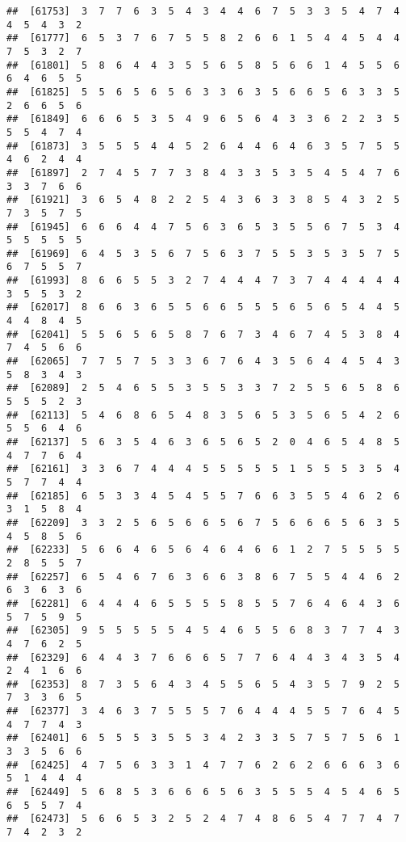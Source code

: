 \documentclass[
]{book}
\begin{document}
\begin{verbatim}
##  [61753]  3  7  7  6  3  5  4  3  4  4  6  7  5  3  3  5  4  7  4  4  5  4  3  2
##  [61777]  6  5  3  7  6  7  5  5  8  2  6  6  1  5  4  4  5  4  4  7  5  3  2  7
##  [61801]  5  8  6  4  4  3  5  5  6  5  8  5  6  6  1  4  5  5  6  6  4  6  5  5
##  [61825]  5  5  6  5  6  5  6  3  3  6  3  5  6  6  5  6  3  3  5  2  6  6  5  6
##  [61849]  6  6  6  5  3  5  4  9  6  5  6  4  3  3  6  2  2  3  5  5  5  4  7  4
##  [61873]  3  5  5  5  4  4  5  2  6  4  4  6  4  6  3  5  7  5  5  4  6  2  4  4
##  [61897]  2  7  4  5  7  7  3  8  4  3  3  5  3  5  4  5  4  7  6  3  3  7  6  6
##  [61921]  3  6  5  4  8  2  2  5  4  3  6  3  3  8  5  4  3  2  5  7  3  5  7  5
##  [61945]  6  6  6  4  4  7  5  6  3  6  5  3  5  5  6  7  5  3  4  5  5  5  5  5
##  [61969]  6  4  5  3  5  6  7  5  6  3  7  5  5  3  5  3  5  7  5  6  7  5  5  7
##  [61993]  8  6  6  5  5  3  2  7  4  4  4  7  3  7  4  4  4  4  4  3  5  5  3  2
##  [62017]  8  6  6  3  6  5  5  6  6  5  5  5  6  5  6  5  4  4  5  4  4  8  4  5
##  [62041]  5  5  6  5  6  5  8  7  6  7  3  4  6  7  4  5  3  8  4  7  4  5  6  6
##  [62065]  7  7  5  7  5  3  3  6  7  6  4  3  5  6  4  4  5  4  3  5  8  3  4  3
##  [62089]  2  5  4  6  5  5  3  5  5  3  3  7  2  5  5  6  5  8  6  5  5  5  2  3
##  [62113]  5  4  6  8  6  5  4  8  3  5  6  5  3  5  6  5  4  2  6  5  5  6  4  6
##  [62137]  5  6  3  5  4  6  3  6  5  6  5  2  0  4  6  5  4  8  5  4  7  7  6  4
##  [62161]  3  3  6  7  4  4  4  5  5  5  5  5  1  5  5  5  3  5  4  5  7  7  4  4
##  [62185]  6  5  3  3  4  5  4  5  5  7  6  6  3  5  5  4  6  2  6  3  1  5  8  4
##  [62209]  3  3  2  5  6  5  6  6  5  6  7  5  6  6  6  5  6  3  5  4  5  8  5  6
##  [62233]  5  6  6  4  6  5  6  4  6  4  6  6  1  2  7  5  5  5  5  2  8  5  5  7
##  [62257]  6  5  4  6  7  6  3  6  6  3  8  6  7  5  5  4  4  6  2  6  3  6  3  6
##  [62281]  6  4  4  4  6  5  5  5  5  8  5  5  7  6  4  6  4  3  6  5  7  5  9  5
##  [62305]  9  5  5  5  5  5  4  5  4  6  5  5  6  8  3  7  7  4  3  4  7  6  2  5
##  [62329]  6  4  4  3  7  6  6  6  5  7  7  6  4  4  3  4  3  5  4  2  4  1  6  6
##  [62353]  8  7  3  5  6  4  3  4  5  5  6  5  4  3  5  7  9  2  5  7  3  3  6  5
##  [62377]  3  4  6  3  7  5  5  5  7  6  4  4  4  5  5  7  6  4  5  4  7  7  4  3
##  [62401]  6  5  5  5  3  5  5  3  4  2  3  3  5  7  5  7  5  6  1  3  3  5  6  6
##  [62425]  4  7  5  6  3  3  1  4  7  7  6  2  6  2  6  6  6  3  6  5  1  4  4  4
##  [62449]  5  6  8  5  3  6  6  6  5  6  3  5  5  5  4  5  4  6  5  6  5  5  7  4
##  [62473]  5  6  6  5  3  2  5  2  4  7  4  8  6  5  4  7  7  4  7  7  4  2  3  2

\end{verbatim}
\end{document}
